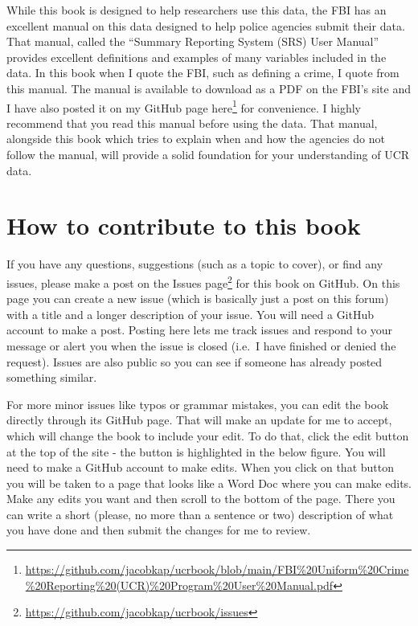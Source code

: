 \documentclass[
]{krantz}
\renewcommand{\href}[2]{#2\footnote{\url{#1}}}
\begin{document}
While this book is designed to help researchers use this
data, the FBI has an excellent manual on this data designed
to help police agencies submit their data. That manual,
called the ``Summary Reporting System (SRS) User Manual''
provides excellent definitions and examples of many
variables included in the data. In this book when I quote
the FBI, such as defining a crime, I quote from this manual.
The manual is available to download as a PDF on the FBI's
site and I have also posted it on my GitHub page
\href{https://github.com/jacobkap/ucrbook/blob/main/FBI\%20Uniform\%20Crime\%20Reporting\%20(UCR)\%20Program\%20User\%20Manual.pdf}{here}
for convenience. I highly recommend that you read this
manual before using the data. That manual, alongside this
book which tries to explain when and how the agencies do not
follow the manual, will provide a solid foundation for your
understanding of UCR data.

\section{How to contribute to this
book}\label{how-to-contribute-to-this-book}

If you have any questions, suggestions (such as a topic to
cover), or find any issues, please make a post on the
\href{https://github.com/jacobkap/ucrbook/issues}{Issues
page} for this book on GitHub. On this page you can create a
new issue (which is basically just a post on this forum)
with a title and a longer description of your issue. You
will need a GitHub account to make a post. Posting here lets
me track issues and respond to your message or alert you
when the issue is closed (i.e.~I have finished or denied the
request). Issues are also public so you can see if someone
has already posted something similar.

For more minor issues like typos or grammar mistakes, you
can edit the book directly through its GitHub page. That
will make an update for me to accept, which will change the
book to include your edit. To do that, click the edit button
at the top of the site - the button is highlighted in the
below figure. You will need to make a GitHub account to make
edits. When you click on that button you will be taken to a
page that looks like a Word Doc where you can make edits.
Make any edits you want and then scroll to the bottom of the
page. There you can write a short (please, no more than a
sentence or two) description of what you have done and then
submit the changes for me to review.
\end{document}

